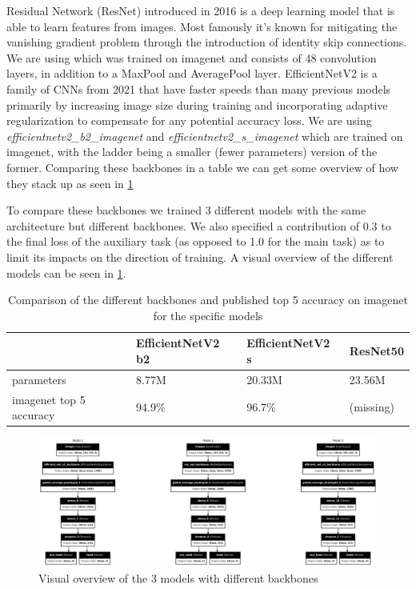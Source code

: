 \documentclass[12pt,a4paper,oneside]{article}
\begin{document}
\smallskip
Residual Network (ResNet) \cite{he2016identity} introduced in 2016 is a deep learning model that is able to learn features from images. Most famously it's known for mitigating the vanishing gradient problem through the introduction of identity skip connections. We are using  which was trained on imagenet and consists of 48 convolution layers, in addition to a MaxPool and AveragePool layer. EfficientNetV2 \cite{tan2021efficientnetv2} is a family of CNNs from 2021 that have faster speeds than many previous models primarily by increasing image size during training and incorporating adaptive regularization to compensate for any potential accuracy loss. We are using \textit{efficientnetv2\_b2\_imagenet} and \textit{efficientnetv2\_s\_imagenet} which are trained on imagenet, with the ladder being a smaller (fewer parameters) version of the former. Comparing these backbones in a table we can get some overview of how they stack up as seen in \ref{tab:backbone_comparison}

To compare these backbones we trained 3 different models with the same architecture but different backbones. We also specified a contribution of 0.3 to the final loss of the auxiliary task (as opposed to 1.0 for the main task) as to limit its impacts on the direction of training. A visual overview of the different models can be seen in \ref{fig:models_overview}. 


\begin{table}[!h]
    
    \centering
    \begin{tabular}{@{}llll@{}}
    \toprule
    & EfficientNetV2 b2 & EfficientNetV2 s & ResNet50 \\ \midrule
    parameters              & 8.77M             & 20.33M           & 23.56M   \\
    imagenet top 5 accuracy & 94.9\%            & 96.7\%           & (missing)       \\ \bottomrule
\end{tabular}
\caption{Comparison of the different backbones and published top 5 accuracy on imagenet for the specific models}
\label{tab:backbone_comparison}
\end{table}

\begin{figure}[!h]
    \centering
    \includegraphics[width=1\textwidth]{assets/different_models.png}
    \caption{Visual overview of the 3 models with different backbones}
    \label{fig:models_overview}
\end{figure}
\end{document}
